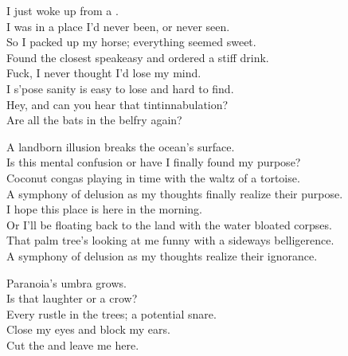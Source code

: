 
\label{album:phantom-island}





I just woke up from a . \\
I was in a place I'd never been, or never seen. \\
So I packed up my horse; everything seemed sweet. \\
Found the closest speakeasy and ordered a stiff drink. \\

Fuck, I never thought I'd lose my mind. \\
I s'pose sanity is easy to lose and hard to find. \\
Hey, and can you hear that tintinnabulation? \\
Are all the bats in the belfry again? \\


A landborn illusion breaks the ocean's surface. \\
Is this mental confusion or have I finally found my purpose? \\
Coconut congas playing in time with the waltz of a tortoise. \\
A symphony of delusion as my thoughts finally realize their purpose. \\
I hope this place is here in the morning. \\
Or I'll be floating back to the land with the water bloated corpses. \\
That palm tree's looking at me funny with a sideways belligerence. \\
A symphony of delusion as my thoughts realize their ignorance. \\


Paranoia's umbra grows. \\
Is that laughter or a crow? \\
Every rustle in the trees; a potential snare. \\
Close my eyes and block my ears. \\
Cut the  and leave me here. \\

